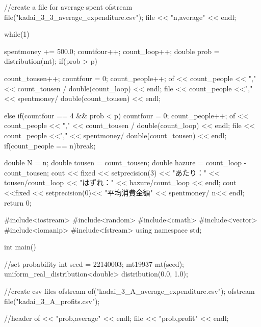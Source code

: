 \documentclass[fleqn, a4paper. 12pt]{ltjsarticle} %
\begin{document}
\begin{cppcode}
{    //create a file for  average spent
    ofstream file("kadai_3_3_average_expenditure.csv");
    file << "n,average" << endl;


    while(1){
        spentmoney += 500.0;
        countfour++;
        count_loop++;
        double prob = distribution(mt);
        if(prob > p){
            count_tousen++;
            countfour = 0;
            count_people++;
            of << count_people << "," << count_tousen / double(count_loop) << endl;
            file << count_people <<"," << spentmoney/ double(count_tousen) << endl;

        }
        else if(countfour == 4 && prob < p){
            countfour = 0;
            count_people++;
            of << count_people << "," << count_tousen / double(count_loop) << endl;
            file << count_people <<"," << spentmoney/ double(count_tousen) << endl;
        }
        if(count_people == n)break;
    }
    double N = n;
    double tousen = count_tousen;
    double hazure = count_loop - count_tousen;
    cout << fixed << setprecision(3) <<  "あたり：" << tousen/count_loop << "はずれ：" << hazure/count_loop << endl;
    cout <<fixed << setprecision(0)<< "平均消費金額" <<  spentmoney/ n<< endl;
    return 0;
}
#include<iostream>
#include<random>
#include<cmath>
#include<vector>
#include<iomanip>
#include<fstream>
using namespace std;

int main(){

    //set probability
    int seed = 22140003;
    mt19937 mt(seed);
    uniform_real_distribution<double> distribution(0.0, 1.0);

    //create csv files
    ofstream of("kadai_3_A_average_expenditure.csv");
    ofstream file("kadai_3_A_profits.csv");

    //header
    of << "prob,average" << endl;
    file << "prob,profit" << endl;

}
\end{cppcode}
\end{document}
